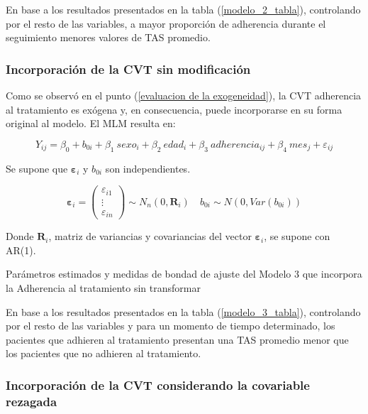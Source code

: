 \documentclass[spanish]{article}
\numberwithin{figure}{subsection}
\numberwithin{equation}{subsection}
\numberwithin{table}{subsection}
\begin{document}
En base a los resultados presentados en la tabla (\ref{modelo_2_tabla}),
controlando por el resto de las variables, a mayor proporción de adherencia
durante el seguimiento menores valores de TAS promedio.

\subsubsection{Incorporación de la CVT sin modificación}

Como se observó en el punto (\ref{evaluacion de la exogeneidad}), la CVT
adherencia al tratamiento es exógena y, en consecuencia, puede incorporarse en
su forma original al modelo. El MLM resulta en:

\begin{equation}
	\label{modelo_3}
	Y_{ij} = \beta_0 + b_{0i} + \beta_1\ sexo_i + \beta_2\ edad_i + \beta_3\ adherencia_{ij}
	+ \beta_4\ mes_j + \varepsilon_{ij}
\end{equation}

Se supone que $\bm{\varepsilon}_i$ y $b_{0i}$ son independientes.

\[ 
	\bm{\varepsilon}_i = \begin{pmatrix} \varepsilon_{i1} \\ \vdots \\ \varepsilon_{in} \end{pmatrix} \sim N_{n}(0, \bm{R}_i)
	\quad
	b_{0i} \sim N(0, Var(b_{0i}))
\]

Donde $\bm{R}_i$, matriz de variancias y covariancias del vector
$\bm{\varepsilon}_{i}$, se supone con AR(1).

\begin{table}[H]
	\centering
	\caption{Parámetros estimados y medidas de bondad de ajuste del Modelo 3 que incorpora la Adherencia al tratamiento sin transformar}
	\label{modelo_3_tabla}
	
\end{table}

En base a los resultados presentados en la tabla (\ref{modelo_3_tabla}),
controlando por el resto de las variables y para un momento de tiempo
determinado, los pacientes que adhieren al tratamiento presentan una TAS
promedio menor que los pacientes que no adhieren al tratamiento.

\subsubsection{Incorporación de la CVT considerando la covariable rezagada}
\end{document}
